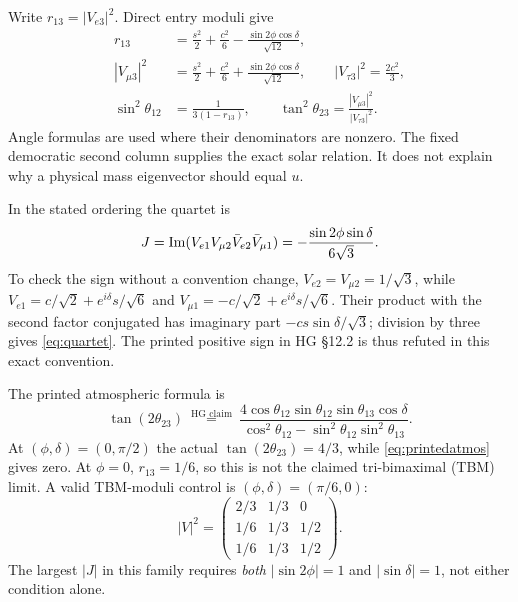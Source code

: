 \documentclass[11pt,a4paper]{article}
\numberwithin{equation}{section}
\begin{document}
Write $r_{13}=|V_{e3}|^2$. Direct entry moduli give
\begin{align}
 r_{13}&=\frac{s^2}{2}+\frac{c^2}{6}-\frac{\sin2\phi\cos\delta}{\sqrt{12}},\label{eq:reactor}\\
 |V_{\mu3}|^2&=\frac{s^2}{2}+\frac{c^2}{6}+\frac{\sin2\phi\cos\delta}{\sqrt{12}},\qquad
 |V_{\tau3}|^2=\frac{2c^2}{3},\nonumber\\
 \sin^2\theta_{12}&=\frac1{3(1-r_{13})},\qquad
 \tan^2\theta_{23}=\frac{|V_{\mu3}|^2}{|V_{\tau3}|^2}.\label{eq:angles}
\end{align}
Angle formulas are used where their denominators are nonzero. The fixed democratic second column supplies the exact solar relation. It does not explain why a physical mass eigenvector should equal $u$.

In the stated ordering the quartet is
\begin{equation}\label{eq:quartet}
 J=\operatorname{Im}(V_{e1}V_{\mu2}\bar V_{e2}\bar V_{\mu1})
   =-\frac{\sin2\phi\sin\delta}{6\sqrt3}.
\end{equation}
To check the sign without a convention change, $V_{e2}=V_{\mu2}=1/\sqrt3$, while $V_{e1}=c/\sqrt2+e^{i\delta}s/\sqrt6$ and $V_{\mu1}=-c/\sqrt2+e^{i\delta}s/\sqrt6$. Their product with the second factor conjugated has imaginary part $-cs\sin\delta/\sqrt3$; division by three gives \eqref{eq:quartet}. The printed positive sign in HG \S12.2 is thus refuted in this exact convention.

The printed atmospheric formula is
\begin{equation}\label{eq:printedatmos}
 \tan(2\theta_{23})\ \overset{\text{HG claim}}{=}\
 \frac{4\cos\theta_{12}\sin\theta_{12}\sin\theta_{13}\cos\delta}
 {\cos^2\theta_{12}-\sin^2\theta_{12}\sin^2\theta_{13}}.
\end{equation}
At $(\phi,\delta)=(0,\pi/2)$ the actual $\tan(2\theta_{23})=4/3$, while \eqref{eq:printedatmos} gives zero. At $\phi=0$, $r_{13}=1/6$, so this is not the claimed tri-bimaximal (TBM) limit. A valid TBM-moduli control is $(\phi,\delta)=(\pi/6,0)$:
\begin{equation}\label{eq:tbm}
 |V|^2=\begin{pmatrix}2/3&1/3&0\\1/6&1/3&1/2\\1/6&1/3&1/2\end{pmatrix}.
\end{equation}
The largest $|J|$ in this family requires \emph{both} $|\sin2\phi|=1$ and $|\sin\delta|=1$, not either condition alone.
\end{document}
